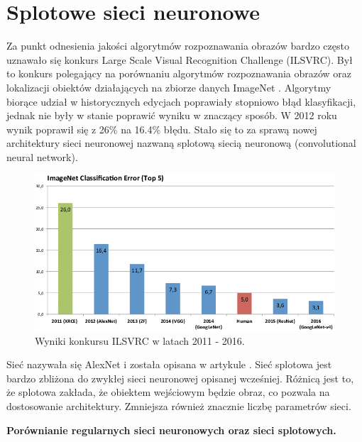 \documentclass[a4paper,11pt, notitlepage, twosides, openany ]{report}
\begin{document}
	\chapter{Splotowe sieci neuronowe}
	Za punkt odnesienia jakości algorytmów rozpoznawania obrazów bardzo często uznawało się konkurs Large Scale Visual Recognition Challenge (ILSVRC). Był to konkurs polegający na porównaniu algorytmów rozpoznawania obrazów oraz lokalizacji obiektów działających na zbiorze danych ImageNet \cite{imagenet_cvpr09}. Algorytmy biorące udział w historycznych edycjach poprawiały stopniowo błąd klasyfikacji, jednak nie były w stanie poprawić wyniku w znaczący sposób. W 2012 roku wynik poprawił się z 26\% na 16.4\% błędu. Stało się to za sprawą nowej architektury sieci neuronowej nazwaną splotową siecią neuronową (convolutional neural network).

	\begin{figure}[h!]
		\centering
		\includegraphics[width=1 \textwidth]{imnet.png}
		\caption{Wyniki konkursu ILSVRC w latach 2011 - 2016.}
		\label{imnet}
	\end{figure}

	Sieć nazywała się AlexNet i została opisana w artykule \cite{NIPS2012_4824}. Sieć splotowa jest bardzo zbliżona do zwykłej sieci neuronowej opisanej wcześniej. Różnicą jest to, że splotowa zakłada, że obiektem wejściowym będzie obraz, co pozwala na dostosowanie architektury. Zmniejsza również znacznie liczbę parametrów sieci.


	\textbf{Porównianie regularnych sieci neuronowych oraz sieci splotowych.}
\end{document}
